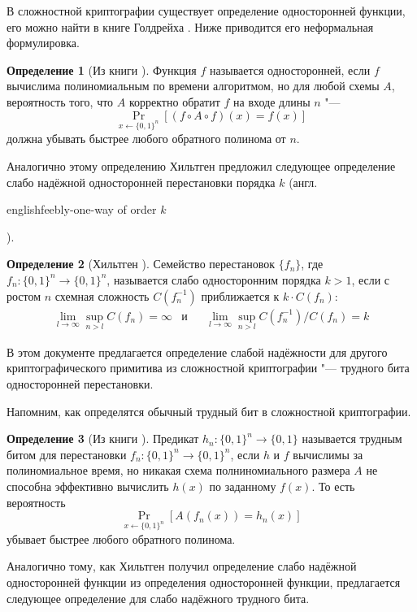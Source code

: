 \documentclass[oneside, a4paper]{article}
\theoremstyle{definition}
\newtheorem{definition}{Определение}
\theoremstyle{remark}
\begin{document}
В сложностной криптографии существует определение односторонней функции, его
можно найти в книге Голдрейха \cite{goldreich}. Ниже приводится его неформальная
формулировка.

\begin{definition}[Из книги \cite{goldreich}]
Функция $f$ называется односторонней, если $f$ вычислима полиномиальным по
времени алгоритмом, но для любой схемы $A$, вероятность того, что $A$ корректно
обратит $f$ на входе длины $n$ "---
\[
\Pr_{x \gets \{0, 1\}^n}[(f \circ A \circ f)(x) = f(x)]
\]
должна убывать быстрее любого обратного полинома от $n$.
\end{definition}

Аналогично этому определению Хильтген \cite{hiltgen} предложил
следующее определение слабо надёжной односторонней перестановки порядка
$k$ (англ. \begin{foreignlanguage}{english}feebly-one-way of order
$k$\end{foreignlanguage}).

\begin{definition}[Хильтген \cite{hiltgen}]
Семейство перестановок $\{f_n\}$, где $f_n : \{0, 1\}^n \to \{0, 1\}^n$,
называется слабо односторонним порядка $k > 1$, если с ростом $n$ схемная
сложность $C(f_n^{-1})$ приближается к $k \cdot C(f_n)$:
\[
\begin{aligned}
&\lim_{l \to \infty} \sup_{n > l} C(f_n) = \infty
&
\text{и}&
&
\lim_{l \to \infty} \sup_{n > l} C(f_n^{-1}) / C(f_n) = k&
\end{aligned}
\]
\end{definition}

В этом документе предлагается определение слабой надёжности для другого
криптографического примитива из сложностной криптографии "--- трудного бита
односторонней перестановки.

Напомним, как определятся обычный трудный бит в сложностной криптографии.

\begin{definition}[Из книги \cite{goldreich}]
Предикат $h_n : \{0, 1\}^n \to \{0, 1\}$ называется трудным битом для
перестановки $f_n : \{0, 1\}^n \to \{0, 1\}^n$, если $h$ и $f$ вычислимы за
полиномиальное время, но никакая схема полниномиального размера $A$ не способна
эффективно вычислить $h(x)$ по заданному $f(x)$. То есть вероятность
\[
\Pr_{x \gets \{0, 1\}^n}[A(f_n(x)) = h_n(x)]
\]
убывает быстрее любого обратного полинома.
\end{definition}

Аналогично тому, как Хильтген получил определение слабо надёжной односторонней
функции из определения односторонней функции, предлагается следующее определение
для слабо надёжного трудного бита.
\end{document}

